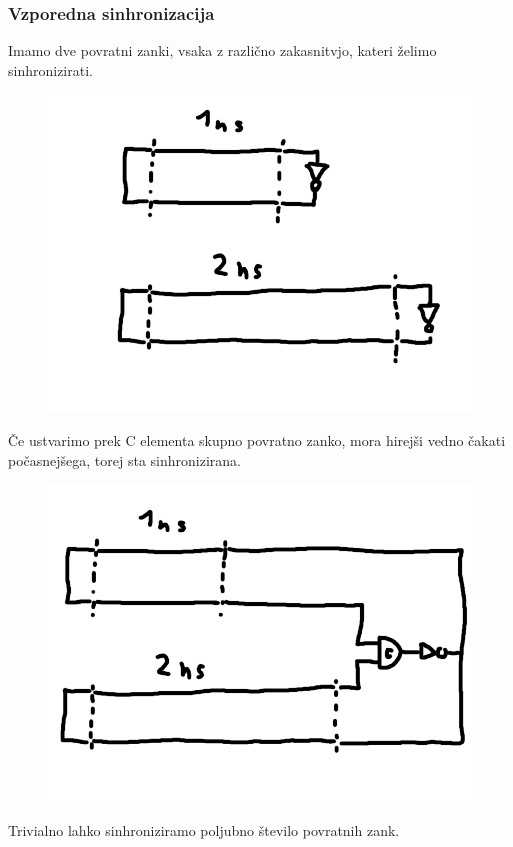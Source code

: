 \subsubsection{Vzporedna sinhronizacija} \label{c}

Imamo dve povratni zanki, vsaka z različno zakasnitvjo, kateri želimo sinhronizirati.

\begin{figure}
	\centering
	\includegraphics[width=0.7\linewidth]{slike/dly1}
	\caption{}
	\label{fig:celement}
\end{figure}

Če ustvarimo prek C elementa skupno povratno zanko, mora hirejši vedno čakati počasnejšega, torej sta sinhronizirana.

\begin{figure}
	\centering
	\includegraphics[width=0.7\linewidth]{slike/dly2}
	\caption{}
	\label{fig:celement}
\end{figure}

Trivialno lahko sinhroniziramo poljubno število povratnih zank.

